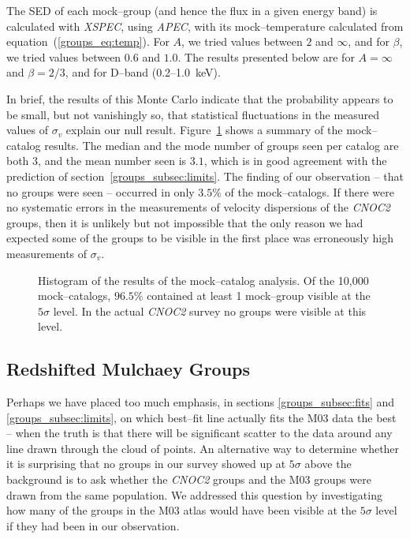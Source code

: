 The SED of each mock--group (and hence the flux in a given energy
band) is calculated with \textsl{XSPEC}, using \textsl{APEC}, with its
mock--temperature calculated from equation~(\ref{groups_eq:temp}).
For $A$, we tried values between $2$ and $\infty$, and for $\beta$, we
tried values between $0.6$ and $1.0$.  The results presented below are
for $A=\infty$ and $\beta=2/3$, and for D--band (0.2--1.0~keV).

In brief, the results of this Monte Carlo indicate that the
probability appears to be small, but not vanishingly so, that
statistical fluctuations in the measured values of $\sigma_v$ explain
our null result.  Figure~\ref{groups_fig:histsim} shows a summary of
the mock--catalog results.  The median and the mode number of groups
seen per catalog are both $3$, and the mean number seen is $3.1$,
which is in good agreement with the prediction of
section~\ref{groups_subsec:limits}.  The finding of our observation --
that no groups were seen -- occurred in only $3.5\%$ of the
mock--catalogs.  If there were no systematic errors in the
measurements of velocity dispersions of the \textsl{CNOC2} groups,
then it is unlikely but not impossible that the only reason we had
expected some of the groups to be visible in the first place was
erroneously high measurements of $\sigma_v$.

\begin{figure}[p]
\caption[Histogram of the results of the mock--catalog
analysis.]{Histogram of the results of the mock--catalog analysis.  Of
the 10,000 mock--catalogs, $96.5\%$ contained at least 1 mock--group
visible at the $5\sigma$ level.  In the actual \textsl{CNOC2} survey
no groups were visible at this level.}
\label{groups_fig:histsim}
\end{figure}
\afterpage{\clearpage}

\vspace{0.5 in}
\subsection{Redshifted Mulchaey Groups}
\label{groups_subsec:M03z}
Perhaps we have placed too much emphasis, in sections
\ref{groups_subsec:fits} and \ref{groups_subsec:limits}, on which
best--fit line actually fits the M03 data the best -- when the truth
is that there will be significant scatter to the data around any line
drawn through the cloud of points.  An alternative way to determine
whether it is surprising that no groups in our survey showed up at
$5\sigma$ above the background is to ask whether the \textsl{CNOC2}
groups and the M03 groups were drawn from the same population.  We
addressed this question by investigating how many of the groups in the
M03 atlas would have been visible at the $5\sigma$ level if they had
been in our observation.

